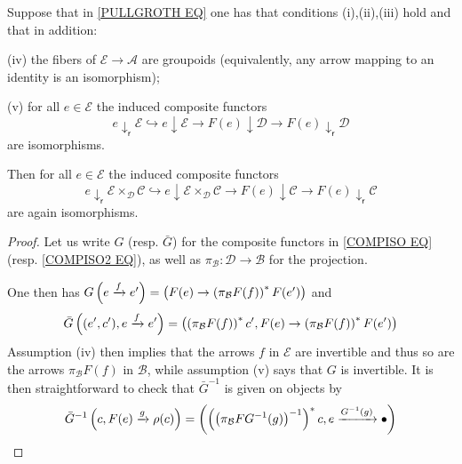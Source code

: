 \documentclass[a4paper,10pt
,draft
]{article}%
\renewcommand{\1}{\eta}%
\begin{document}
\begin{lemma}
Suppose that in \eqref{PULLGROTH EQ}
one has that conditions (i),(ii),(iii)
hold and that in addition:
\begin{inparaenum}
\item[(iv)] the fibers of $\mathcal{E} \to \mathcal{A}$ are groupoids (equivalently, any arrow mapping to an identity is an isomorphism);
\item[(v)]
for all $e \in \mathcal{E}$
the induced composite functors
\begin{equation}\label{COMPISO EQ}
e \downarrow_{\mathsf{r}} \mathcal{E}
	\hookrightarrow
e \downarrow \mathcal{E}
	\to 
F(e) \downarrow \mathcal{D}
	\to
F(e) \downarrow_{\mathsf{r}} \mathcal{D}
\end{equation}
are isomorphisms.
\end{inparaenum}

Then for all 
$e \in \mathcal{E}$
the induced composite functors
\begin{equation}\label{COMPISO2 EQ}
e \downarrow_{\mathsf{r}}
\mathcal{E} \times_{\mathcal{D}} \mathcal{C}
	\hookrightarrow
e \downarrow
\mathcal{E} \times_{\mathcal{D}} \mathcal{C}
	\to 
F(e) \downarrow \mathcal{C}
	\to
F(e) \downarrow_{\mathsf{r}} \mathcal{C}
\end{equation}
are again isomorphisms.
\end{lemma}


\begin{proof}
Let us write $G$ (resp. $\bar{G}$) for the composite functors in \eqref{COMPISO EQ}
(resp. \eqref{COMPISO2 EQ}), as well as 
$\pi_{\mathcal{B}} \colon \mathcal{D} \to \mathcal{B}$
for the projection.

One then has 
$G \left(e \xrightarrow{f} e' \right)=
\left(
F(e) \to \left( \pi_{\mathcal{B}} F(f)\right)^{\**} F(e')
\right)
$
and 
\[
\bar{G}\left((e',c'),e \xrightarrow{f} e' \right) =
\left( \left( \pi_{\mathcal{B}} F(f)\right)^{\**} c', F(e) \to \left( \pi_{\mathcal{B}} F(f)\right)^{\**} F(e')\right)
\]
Assumption (iv) then implies that the arrows
$f$ in $\mathcal{E}$ are invertible
and thus so are the arrows 
$\pi_{\mathcal{B}} F(f)$ in $\mathcal{B}$,
while assumption (v) says that $G$ is invertible.
It is then straightforward to check that 
$\bar{G}^{-1}$ is given on objects by 
\[
\bar{G}^{-1}
\left(c, F(e) \xrightarrow{g} \rho(c) \right)
=
\left(
	\left(
	\left(
	\pi_{\mathcal{B}} F G^{-1}(g)
	\right)^{-1}
\right)^{\**} c, e \xrightarrow{G^{-1}(g)} \bullet
\right)
\]
\end{proof}
\end{document}
